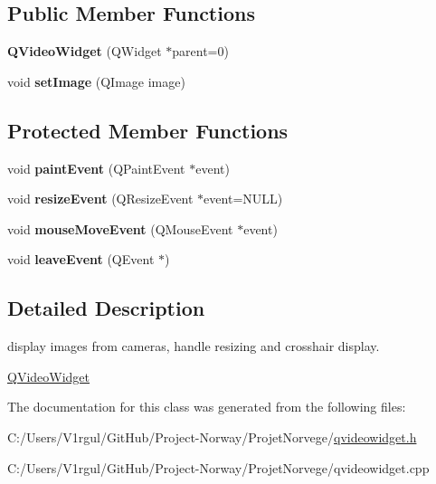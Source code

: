\subsection*{Public Member Functions}
\begin{DoxyCompactItemize}
\item 
\hypertarget{class_q_video_widget_a9556e8daac0717d705ac8c2fd7e4e2a2}{{\bfseries Q\-Video\-Widget} (Q\-Widget $\ast$parent=0)}\label{class_q_video_widget_a9556e8daac0717d705ac8c2fd7e4e2a2}

\item 
\hypertarget{class_q_video_widget_a331955ccf1e82259702db3fc15983eff}{void {\bfseries set\-Image} (Q\-Image image)}\label{class_q_video_widget_a331955ccf1e82259702db3fc15983eff}

\end{DoxyCompactItemize}
\subsection*{Protected Member Functions}
\begin{DoxyCompactItemize}
\item 
\hypertarget{class_q_video_widget_afa241c4f57f7198f4625b9ac42fbaa79}{void {\bfseries paint\-Event} (Q\-Paint\-Event $\ast$event)}\label{class_q_video_widget_afa241c4f57f7198f4625b9ac42fbaa79}

\item 
\hypertarget{class_q_video_widget_a935858a83ef55740c9424870dc652962}{void {\bfseries resize\-Event} (Q\-Resize\-Event $\ast$event=N\-U\-L\-L)}\label{class_q_video_widget_a935858a83ef55740c9424870dc652962}

\item 
\hypertarget{class_q_video_widget_ab04e47a7d99ee39b6d459bfc94c0b0b0}{void {\bfseries mouse\-Move\-Event} (Q\-Mouse\-Event $\ast$event)}\label{class_q_video_widget_ab04e47a7d99ee39b6d459bfc94c0b0b0}

\item 
\hypertarget{class_q_video_widget_a4c1e806be89ef42a8e5a7771115b886f}{void {\bfseries leave\-Event} (Q\-Event $\ast$)}\label{class_q_video_widget_a4c1e806be89ef42a8e5a7771115b886f}

\end{DoxyCompactItemize}


\subsection{Detailed Description}
display images from cameras, handle resizing and crosshair display. 

\hyperlink{class_q_video_widget}{Q\-Video\-Widget} 

The documentation for this class was generated from the following files\-:\begin{DoxyCompactItemize}
\item 
C\-:/\-Users/\-V1rgul/\-Git\-Hub/\-Project-\/\-Norway/\-Projet\-Norvege/\hyperlink{qvideowidget_8h}{qvideowidget.\-h}\item 
C\-:/\-Users/\-V1rgul/\-Git\-Hub/\-Project-\/\-Norway/\-Projet\-Norvege/qvideowidget.\-cpp\end{DoxyCompactItemize}
